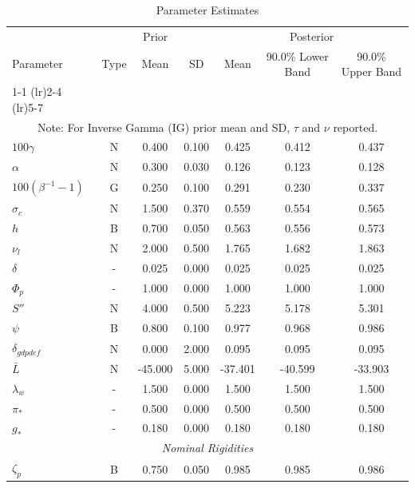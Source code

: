 \documentclass[12pt]{article}
\begin{document}
\pagestyle{empty}
\vspace*{.5cm}
{\small
\begin{longtable}{lcccccc}
\caption{Parameter Estimates}
\\ \hline
\multicolumn{1}{c}{} & \multicolumn{3}{c}{Prior} & \multicolumn{3}{c}{Posterior} \\
Parameter & Type & Mean & SD & Mean & 90.0\% {\tiny Lower Band} & 90.0\% {\tiny Upper Band} \\
\cmidrule(lr){1-1} \cmidrule(lr){2-4} \cmidrule(lr){5-7}
\endhead
\hline
\\ \multicolumn{7}{c}{\footnotesize Note: For Inverse Gamma (IG) prior mean and SD, $\tau$ and $\nu$ reported.}
\endfoot
\multicolumn{7}{c}{\textit{Steady State}} \\[3pt]
$100\gamma$ & N &    0.400 &    0.100 &    0.425 &    0.412 &    0.437 \\
$\alpha$ & N &    0.300 &    0.030 &    0.126 &    0.123 &    0.128 \\
$100(\beta^{-1} - 1)$ & G &    0.250 &    0.100 &    0.291 &    0.230 &    0.337 \\
$\sigma_{c}$ & N &    1.500 &    0.370 &    0.559 &    0.554 &    0.565 \\
$   h$ & B &    0.700 &    0.050 &    0.563 &    0.556 &    0.573 \\
$\nu_l$ & N &    2.000 &    0.500 &    1.765 &    1.682 &    1.863 \\
$\delta$ & - &    0.025 &    0.000 &    0.025 &    0.025 &    0.025 \\
$\Phi_p$ & - &    1.000 &    0.000 &    1.000 &    1.000 &    1.000 \\
$ S''$ & N &    4.000 &    0.500 &    5.223 &    5.178 &    5.301 \\
$\psi$ & B &    0.800 &    0.100 &    0.977 &    0.968 &    0.986 \\
$\delta_{gdpdef}$ & N &    0.000 &    2.000 &    0.095 &    0.095 &    0.095 \\
$\bar{L}$ & N &  -45.000 &    5.000 &  -37.401 &  -40.599 &  -33.903 \\
$\lambda_w$ & - &    1.500 &    0.000 &    1.500 &    1.500 &    1.500 \\
$\pi_*$ & - &    0.500 &    0.000 &    0.500 &    0.500 &    0.500 \\
$ g_*$ & - &    0.180 &    0.000 &    0.180 &    0.180 &    0.180 \\
\multicolumn{7}{c}{\textit{Nominal Rigidities}} \\[3pt]
$\zeta_p$ & B &    0.750 &    0.050 &    0.985 &    0.985 &    0.986 \\

\end{longtable}}
\end{document}
